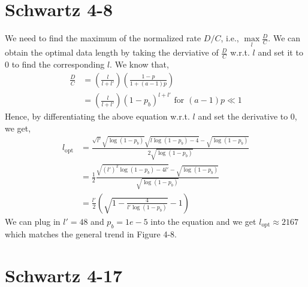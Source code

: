 \documentclass{article}
\begin{document}
\section*{Schwartz 4-8}
	We need to find the maximum of the normalized rate $D/C$, i.e., $\max\limits_{l}\frac{D}{C}$.
	We can obtain the optimal data length by taking the derviative of $\frac{D}{C}$
	w.r.t. $l$ and set it to 0 to find the corresponding $l$. We know that,
	\begin{align*}
		\frac{D}{C} &= (\frac{l}{l+l'})(\frac{1-p}{1 + (a-1)p}) \\
		&= (\frac{l}{l+l'})(1-p_b)^{l+l'} \text{ for } (a-1)p \ll 1
	\end{align*}
	Hence, by differentiating the above equation w.r.t. $l$ and set the derivative
	to 0, we get,
	\begin{align*}
		l_{\text{opt}} &= \frac{\sqrt{l'} \sqrt{\log{(1-p_{b})}} \sqrt{l\log{(1-p_{b})} - 4} - \sqrt{\log{(1-p_{b})}}}{2 \sqrt{\log{(1-p_{b})}}} \\
		&= \frac{1}{2} \frac{\sqrt{(l')^{2} \log{(1-p_{b})} - 4l'} - \sqrt{\log{(1-p_{b})}}}{\sqrt{\log{(1-p_{b})}}} \\
		&= \frac{l'}{2} ( \sqrt{1 - \frac{4}{l' \log{(1-p_{b})}}} - 1)
	\end{align*}
	We can plug in $l' = 48$ and $p_{b} = 1e-5$ into the equation and we get
	$l_{\text{opt}} \approx 2167$ which matches the general trend in Figure 4-8.

\section*{Schwartz 4-17}
\end{document}
